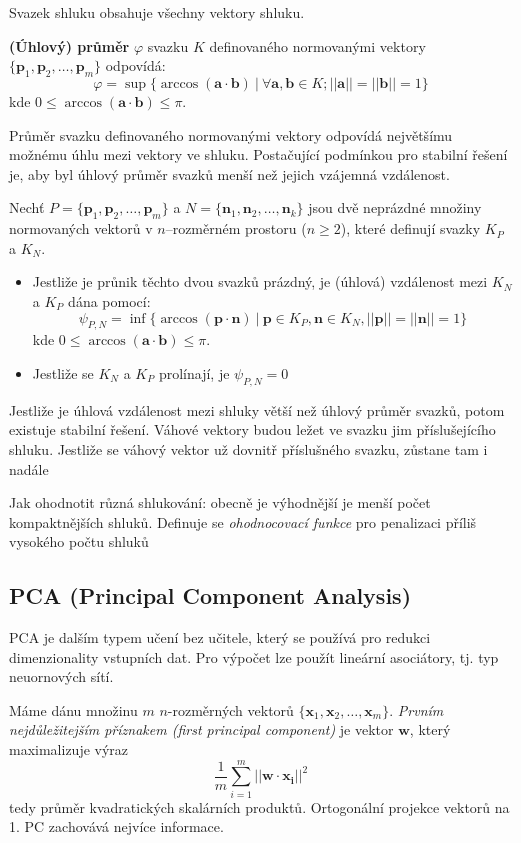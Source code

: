 \documentclass[11pt]{report} %
\renewcommand{\vec}[1]{\mathbf{#1}}
\numberwithin{equation}{section}
\begin{document}
Svazek shluku obsahuje všechny vektory  shluku. 

\textbf{(Úhlový) průměr} $\varphi$ svazku $K$ definovaného normovanými vektory $\{\vec{p}_1, \vec{p}_2, \dots, \vec{p}_m\}$ odpovídá:
$$\varphi = \sup\{\arccos(\vec{a}\cdot\vec{b})\ |\ \forall\vec{a},\vec{b} \in K; ||\vec{a}|| = ||\vec{b}|| = 1 \}$$
kde $0 \leq \arccos(\vec{a}\cdot\vec{b}) \leq \pi$.

Průměr svazku definovaného normovanými vektory odpovídá největšímu možnému úhlu mezi vektory ve shluku. Postačující podmínkou pro stabilní řešení je, aby byl úhlový průměr svazků menší než jejich vzájemná
vzdálenost.

Nechť $P = \{\vec{p}_1, \vec{p}_2, \dots, \vec{p}_m\}$ a $N = \{\vec{n}_1, \vec{n}_2, \dots, \vec{n}_k\}$ jsou dvě neprázdné množiny normovaných vektorů v $n$–rozměrném prostoru ($n \geq 2$), které definují svazky $K_P$ a $K_N$.
\begin{itemize}
	\item Jestliže je průnik těchto dvou svazků prázdný, je (úhlová) vzdálenost mezi $K_N$ a $K_P$ dána pomocí:
	$$\psi_{P,N} = \inf\{\arccos(\vec{p}\cdot\vec{n})\ |\ \vec{p} \in K_P, \vec{n} \in K_N, ||\vec{p}|| = ||\vec{n}|| = 1 \}$$
	kde $0 \leq \arccos(\vec{a}\cdot\vec{b}) \leq \pi$.
	\item Jestliže se $K_N$ a $K_P$ prolínají, je $\psi_{P,N} = 0$
\end{itemize}

Jestliže je úhlová vzdálenost mezi shluky větší než úhlový průměr svazků, potom existuje stabilní řešení.
Váhové vektory budou ležet ve svazku jim příslušejícího shluku. Jestliže se váhový vektor už  dovnitř příslušného svazku, zůstane tam i nadále

Jak ohodnotit různá shlukování: obecně je výhodnější je menší počet kompaktnějších shluků. Definuje se \textit{ohodnocovací funkce} pro penalizaci příliš vysokého počtu shluků



\subsection{PCA (Principal Component Analysis)}
PCA je dalším typem učení bez učitele, který se používá pro redukci dimenzionality vstupních dat. Pro výpočet lze použít lineární asociátory, tj. typ neuornových sítí.

Máme dánu množinu $m$ $n$-rozměrných vektorů $\{\vec{x}_1, \vec{x}_2, \dots, \vec{x}_m\}$. \textit{Prvním nejdůležitejším příznakem (first principal component)} je vektor $\vec{w}$, který maximalizuje výraz
$$\frac{1}{m}\sum_{i=1}^{m}||\vec{w}\cdot\vec{x_i}||^2$$
tedy průměr kvadratických skalárních produktů. Ortogonální projekce vektorů na 1. PC zachovává nejvíce informace.
\end{document}
